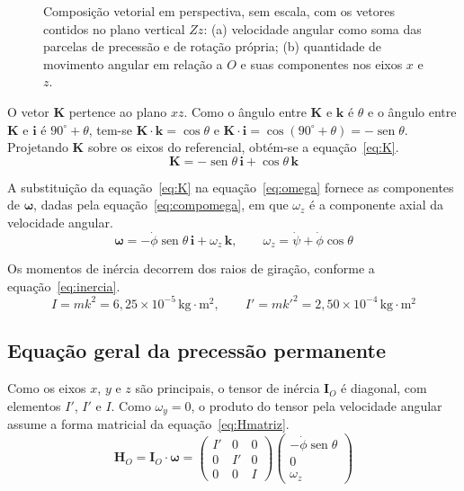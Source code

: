 \documentclass[12pt,a4paper]{article}
\newcommand{\vet}[1]{\mathbf{#1}}
\newcommand{\vomega}{\boldsymbol{\omega}}
\newcommand{\seno}{\operatorname{sen}}
\newcommand{\un}[1]{\,\mathrm{#1}}
\newcommand{\phid}{\dot{\phi}}
\newcommand{\psid}{\dot{\psi}}
\begin{document}
\begin{figure}[H]
\centering

\caption[Composição vetorial de $\boldsymbol{\omega}$ e de $\mathbf{H}_O$ em perspectiva]{Composição vetorial em perspectiva, sem escala, com os vetores contidos no plano vertical $Zz$: (a) velocidade angular como soma das parcelas de precessão e de rotação própria; (b) quantidade de movimento angular em relação a $O$ e suas componentes nos eixos $x$ e $z$.}
\label{fig:vetores}
\end{figure}

O vetor $\vet{K}$ pertence ao plano $xz$. Como o ângulo entre $\vet{K}$ e $\vet{k}$ é $\theta$ e o ângulo entre $\vet{K}$ e $\vet{i}$ é $90^\circ+\theta$, tem-se $\vet{K}\cdot\vet{k}=\cos\theta$ e $\vet{K}\cdot\vet{i}=\cos(90^\circ+\theta)=-\seno\theta$. Projetando $\vet{K}$ sobre os eixos do referencial, obtém-se a equação~\ref{eq:K}.
\begin{equation}
\vet{K} = -\seno\theta\,\vet{i} + \cos\theta\,\vet{k}
\label{eq:K}
\end{equation}

A substituição da equação~\ref{eq:K} na equação~\ref{eq:omega} fornece as componentes de $\vomega$, dadas pela equação~\ref{eq:compomega}, em que $\omega_z$ é a componente axial da velocidade angular.
\begin{equation}
\vomega = -\phid\seno\theta\,\vet{i} + \omega_z\,\vet{k},
\qquad
\omega_z = \psid + \phid\cos\theta
\label{eq:compomega}
\end{equation}

Os momentos de inércia decorrem dos raios de giração, conforme a equação~\ref{eq:inercia}.
\begin{equation}
I = mk^2 = 6,25\times10^{-5}\un{kg\cdot m^2},
\qquad
I' = mk'^2 = 2,50\times10^{-4}\un{kg\cdot m^2}
\label{eq:inercia}
\end{equation}

\subsection{Equação geral da precessão permanente}

Como os eixos $x$, $y$ e $z$ são principais, o tensor de inércia $\vet{I}_O$ é diagonal, com elementos $I'$, $I'$ e $I$. Como $\omega_y=0$, o produto do tensor pela velocidade angular assume a forma matricial da equação~\ref{eq:Hmatriz}.
\begin{equation}
\vet{H}_O = \vet{I}_O\cdot\vomega =
\begin{pmatrix}I'&0&0\\0&I'&0\\0&0&I\end{pmatrix}
\begin{pmatrix}-\phid\seno\theta\\0\\\omega_z\end{pmatrix}
\label{eq:Hmatriz}
\end{equation}
\end{document}
